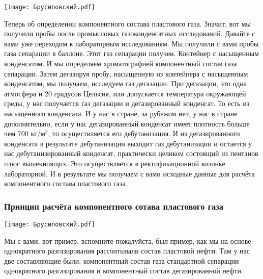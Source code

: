 \documentclass[main.tex]{subfiles}
\begin{document}
\begin{center}
\texttt{[image: Брусиловский.pdf]}
\end{center}

Теперь об определении компонентного состава пластового газа.
Значит, вот мы получили пробы после промысловых газоконденсатных исследований.
Давайте с вами уже переходим к лабораторным исследованиям.
Мы получили с вами пробы газа сепарации в баллоне.
Этот газ сепарации получен.
Контейнер с насыщенным конденсатом.
И мы определяем хроматографией компонентный состав газа сепарации.
Затем дегазируя пробу, насыщенную из контейнера с насыщенным конденсатом, мы получаем, исследуем газ дегазации.
При дегазации, это одна атмосфера и 20 градусов Цельсия, или допускается температура окружающей среды, у нас получается газ дегазации и дегазированный конденсат.
То есть из насыщенного конденсата.
И у нас в стране, за рубежом нет, у нас в стране дополнительно, если у нас дегазированный конденсат имеет плотность больше чем 700 кг/м$^3$, то осуществляется его дебутанизация.
И из дегазированного конденсата в результате дебутанизации выходит газ дебутанизации и остается у нас дебутанизированный конденсат, практически целиком состоящий из пентанов плюс вышекипящих.
Это осуществляется в ректификационной колонке лабораторной.
И в результате мы получаем с вами исходные данные для расчёта компонентного состава пластового газа.

\subsubsection{Принцип расчёта компонентного сотава пластового газа}

\begin{center}
\texttt{[image: Брусиловский.pdf]}
\end{center}

Мы с вами, вот пример, вспомните пожалуйста, был пример, как мы на основе однократного разгазирования рассчитывали состав пластовой нефти.
Там у нас две составляющие были: компонентный состав газа стандартной сепарации однократного разгазирования и компонентный состав дегазированной нефти.
\end{document}
